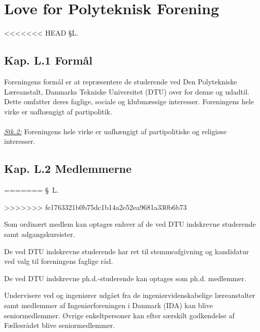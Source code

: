 \setcounter{section}{12}
\section*{Love for Polyteknisk Forening}

\begin{list}
<<<<<<< HEAD
{\S L.}{}


\subsection{Kap. L.1 Formål}
\item \label{l1:formaal} Foreningens formål er at repræsentere de studerende ved Den Polytekniske Læreanstalt, Danmarks Tekniske Universitet (DTU) over for denne og udadtil. Dette omfatter deres faglige, sociale og klubmæssige interesser. Foreningens hele virke er uafhængigt af partipolitik. 
\\ 
\\
\underline{\textit{Stk.2:}} Foreningens hele virke er uafhængigt af partipolitiske og religiøse interesser.
\subsection{Kap. L.2 Medlemmerne}
\label{kapL:medlemmerne}
=======
{\S \ L.}{}
    \setlength{\labelwidth}{.5in}%
    \setlength{\leftmargin}{.25in} %


>>>>>>> fe1763321b0b75dc1b14a2e52ea9681a330b6b73

\item \label{L2:hvem} Som ordinært medlem kan optages enhver af de ved DTU indskrevne studerende samt adgangskursister.

\item \label{L2:stemmeret} De ved DTU indskrevne studerende har ret til stemmeafgivning og kandidatur ved valg til foreningens faglige råd.

\item \label{L2:phd} De ved DTU indskrevne ph.d.-studerende kan optages som ph.d. medlemmer.

\item \label{L2:senior} Undervisere ved og ingeniører udgået fra de ingeniørvidenskabelige læreanstalter samt medlemmer af         Ingeniørforeningen i Danmark (IDA) kan blive seniormedlemmer. Øvrige enkeltpersoner kan efter særskilt godkendelse af Fællesrådet blive seniormedlemmer.


\end{list}
